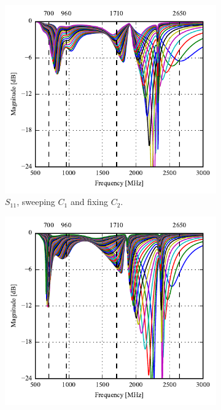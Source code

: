 \begin{figure}[htbp]
   \begin{subfigure}[b]{0.49\linewidth}
        \centering
        \includegraphics{img/tech_sol/monopole/highband/ue/datamode/s11.pdf}
        \caption{$S_{11}$, sweeping $C_1$ and fixing $C_2$.}
    \end{subfigure}
    \hfill
    \begin{subfigure}[b]{0.49\linewidth}
        \centering
        \includegraphics{img/tech_sol/monopole/highband/ue/datamode/s22.pdf}

\end{subfigure}
\end{figure}
